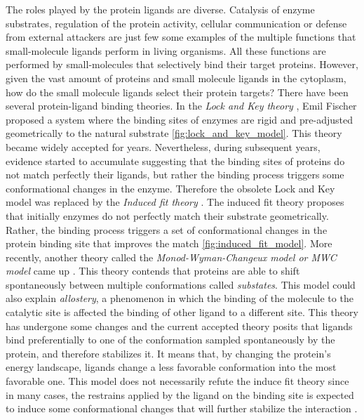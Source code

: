 \documentclass[12pt, b5paper,twoside]{tesi_upf}
\begin{document}
\par The roles played by the protein ligands are diverse. Catalysis of enzyme substrates, regulation of the protein activity, cellular communication or defense from external attackers are just few some examples of the multiple functions that small-molecule ligands perform in living organisms. All these functions are performed by small-molecules that selectively bind their target proteins. However, given the vast amount of proteins and small molecule ligands in the cytoplasm, how do the small molecule ligands select their protein targets? There have been several protein-ligand binding theories. In the \textit{Lock and Key theory} \cite{Cramer1994}, Emil Fischer proposed a system where the binding sites of enzymes are rigid and pre-adjusted geometrically to the natural substrate \ref{fig:lock_and_key_model}. This theory became widely accepted for years. Nevertheless, during subsequent years, evidence started to accumulate suggesting that the binding sites of proteins do not match perfectly their ligands, but rather the binding process triggers some conformational changes in the enzyme. Therefore the obsolete Lock and Key model was replaced by the \textit{Induced fit theory} \cite{Koshland1959}. The induced fit theory proposes that initially enzymes do not perfectly match their substrate geometrically. Rather, the binding process triggers a set of conformational changes in the protein binding site that improves the match \ref{fig:induced_fit_model}. More recently, another theory called the \textit{Monod-Wyman-Changeux model or  MWC model } came up \cite{Monod1965}. This theory contends that proteins are able to shift spontaneously between multiple conformations called \textit{substates}\cite{Kitao1998, Petsko1984}. This model could also explain \textit{allostery}, a phenomenon in which the binding of the molecule to the catalytic site is affected the binding of other ligand to a different site. This theory has undergone some changes and the current accepted theory posits that ligands bind preferentially to one of the conformation sampled spontaneously by the protein, and therefore stabilizes it. It means that, by changing the protein's energy landscape, ligands change a less favorable conformation into the most favorable one. This model does not necessarily refute the induce fit theory since in many cases, the restrains applied by the ligand on the binding site is expected to induce some conformational changes that will further stabilize the interaction \cite{Foote1994, James2003}. 
\end{document}
